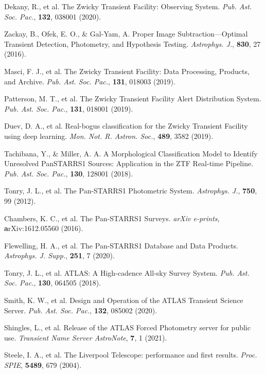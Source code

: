 \documentclass{nature_plusfigure}
\newcommand{\mn}{{Mon. Not. R. Astron. Soc.}}
\newcommand{\mnras}{\mn}
\newcommand{\apj}{{Astrophys. J.}}
\newcommand{\apjs}{{Astrophys. J. Supp.}}
\newcommand{\pasp}{{Pub. Ast. Soc. Pac.}}
\newcommand{\procspie}{Proc. SPIE}
\begin{document}
\begin{methods}
\begin{thebibliography}{10}
 Dekany, R., et al. The Zwicky Transient Facility: Observing System. \emph{\pasp}, \textbf{132}, 038001 (2020). 

 Zackay, B., Ofek, E. O., \& Gal-Yam, A. Proper Image Subtraction—Optimal Transient Detection, Photometry, and Hypothesis Testing. \emph{\apj}, \textbf{830}, 27 (2016). 

 Masci, F. J., et al. The Zwicky Transient Facility: Data Processing, Products, and Archive. \emph{\pasp}, \textbf{131}, 018003 (2019). 

 Patterson, M. T., et al. The Zwicky Transient Facility Alert Distribution System. \emph{\pasp}, \textbf{131}, 018001 (2019). 

  Duev, D. A., et al. Real-bogus classification for the Zwicky Transient Facility using deep learning. \emph{\mnras}, \textbf{489}, 3582 (2019). 

 Tachibana, Y., \& Miller, A. A. A Morphological Classification Model to Identify Unresolved PanSTARRS1 Sources: Application in the ZTF Real-time Pipeline. \emph{\pasp}, \textbf{130}, 128001 (2018). 


 Tonry, J. L., et al. The Pan-STARRS1 Photometric System. \emph{\apj}, \textbf{750}, 99 (2012). 

 Chambers, K. C., et al. The Pan-STARRS1 Surveys. \emph{arXiv e-prints}, \textbf arXiv:1612.05560 (2016). 

  Flewelling, H. A., et al. The Pan-STARRS1 Database and Data Products. \emph{\apjs}, \textbf{251}, 7 (2020). 


 Tonry, J. L., et al. ATLAS: A High-cadence All-sky Survey System. \emph{\pasp}, \textbf{130}, 064505 (2018). 

 Smith, K. W., et al. Design and Operation of the ATLAS Transient Science Server. \emph{\pasp}, \textbf{132}, 085002 (2020). 

 Shingles, L., et al. Release of the ATLAS Forced Photometry server for public use. \emph{Transient Name Server AstroNote}, \textbf{7}, 1 (2021). 


 Steele, I. A., et al. The Liverpool Telescope: performance and first results. \emph{\procspie}, \textbf{5489}, 679 (2004). 


\end{thebibliography}
\end{methods}
\end{document}
